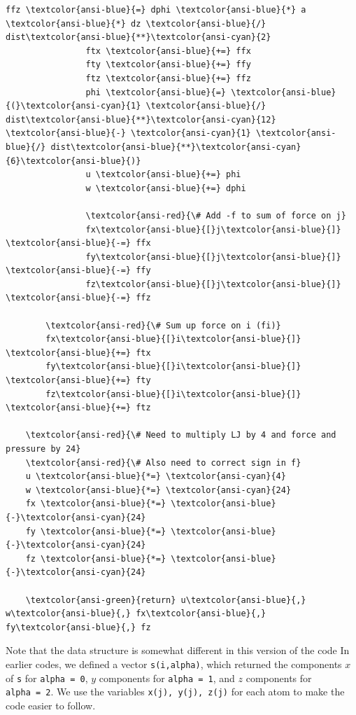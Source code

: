 \documentclass[11pt]{article}
\begin{document}
\begin{Verbatim}[commandchars=\\\{\}]
                ffz \textcolor{ansi-blue}{=} dphi \textcolor{ansi-blue}{*} a \textcolor{ansi-blue}{*} dz \textcolor{ansi-blue}{/} dist\textcolor{ansi-blue}{**}\textcolor{ansi-cyan}{2}
                ftx \textcolor{ansi-blue}{+=} ffx
                fty \textcolor{ansi-blue}{+=} ffy
                ftz \textcolor{ansi-blue}{+=} ffz
                phi \textcolor{ansi-blue}{=} \textcolor{ansi-blue}{(}\textcolor{ansi-cyan}{1} \textcolor{ansi-blue}{/} dist\textcolor{ansi-blue}{**}\textcolor{ansi-cyan}{12} \textcolor{ansi-blue}{-} \textcolor{ansi-cyan}{1} \textcolor{ansi-blue}{/} dist\textcolor{ansi-blue}{**}\textcolor{ansi-cyan}{6}\textcolor{ansi-blue}{)}
                u \textcolor{ansi-blue}{+=} phi
                w \textcolor{ansi-blue}{+=} dphi

                \textcolor{ansi-red}{\# Add -f to sum of force on j}
                fx\textcolor{ansi-blue}{[}j\textcolor{ansi-blue}{]} \textcolor{ansi-blue}{-=} ffx
                fy\textcolor{ansi-blue}{[}j\textcolor{ansi-blue}{]} \textcolor{ansi-blue}{-=} ffy
                fz\textcolor{ansi-blue}{[}j\textcolor{ansi-blue}{]} \textcolor{ansi-blue}{-=} ffz

        \textcolor{ansi-red}{\# Sum up force on i (fi)}
        fx\textcolor{ansi-blue}{[}i\textcolor{ansi-blue}{]} \textcolor{ansi-blue}{+=} ftx
        fy\textcolor{ansi-blue}{[}i\textcolor{ansi-blue}{]} \textcolor{ansi-blue}{+=} fty
        fz\textcolor{ansi-blue}{[}i\textcolor{ansi-blue}{]} \textcolor{ansi-blue}{+=} ftz

    \textcolor{ansi-red}{\# Need to multiply LJ by 4 and force and pressure by 24}
    \textcolor{ansi-red}{\# Also need to correct sign in f}
    u \textcolor{ansi-blue}{*=} \textcolor{ansi-cyan}{4}
    w \textcolor{ansi-blue}{*=} \textcolor{ansi-cyan}{24}
    fx \textcolor{ansi-blue}{*=} \textcolor{ansi-blue}{-}\textcolor{ansi-cyan}{24}
    fy \textcolor{ansi-blue}{*=} \textcolor{ansi-blue}{-}\textcolor{ansi-cyan}{24}
    fz \textcolor{ansi-blue}{*=} \textcolor{ansi-blue}{-}\textcolor{ansi-cyan}{24}

    \textcolor{ansi-green}{return} u\textcolor{ansi-blue}{,} w\textcolor{ansi-blue}{,} fx\textcolor{ansi-blue}{,} fy\textcolor{ansi-blue}{,} fz

    \end{Verbatim}

    
    Note that the data structure is somewhat different in this version of
the code In earlier codes, we defined a vector \texttt{s(i,alpha)},
which returned the components \(x\) of \texttt{s} for
\texttt{alpha\ =\ 0}, \(y\) components for \texttt{alpha\ =\ 1}, and
\(z\) components for \texttt{alpha\ =\ 2}. We use the variables
\texttt{x(j),\ y(j),\ z(j)} for each atom to make the code easier to
follow.
\end{document}
